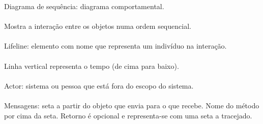 \documentclass[../resumosLPOO.tex]{subfiles}
\begin{document}
 

Diagrama de sequência: diagrama comportamental.

\paragraph{}

Mostra a interação entre os objetos numa ordem sequencial.

\paragraph{}

Lifeline: elemento com nome que representa um indivíduo na interação.

\paragraph{}

Linha vertical representa o tempo (de cima para baixo).

\paragraph{}

Actor: sistema ou pessoa que está fora do escopo do sistema.

\begin{center}
\end{center}

\paragraph{}

Mensagens: seta a partir do objeto que envia para o que recebe. Nome do método por cima da seta.
Retorno é opcional e representa-se com uma seta a tracejado.

\begin{center}
\end{center}
\end{document}
